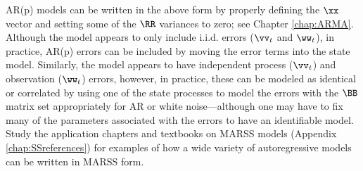 AR(p) models can be written in the above form by properly defining the $\xx$ vector and setting some of the $\RR$ variances to zero; see Chapter \ref{chap:ARMA}. Although the model appears to only include i.i.d. errors ($\vv_t$ and $\ww_t$), in practice, AR(p) errors can be included by moving the error terms into the state model.  Similarly, the model appears to have independent process ($\vv_t$) and observation ($\ww_t$) errors, however, in practice, these can be modeled as identical or correlated by using one of the state processes to model the errors with the $\BB$ matrix set appropriately for AR or white noise---although one may have to fix many of the parameters associated with the errors to have an identifiable model.  Study the application chapters and textbooks on MARSS models (Appendix \ref{chap:SSreferences}) for examples of how a wide variety of autoregressive models can be written in MARSS form.  


